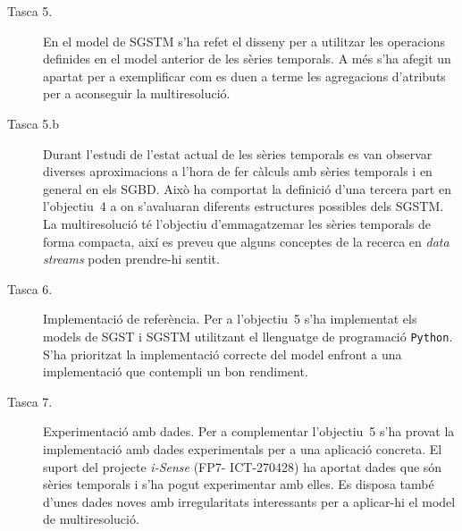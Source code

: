 \begin{description}
\item[Tasca 5.] En el model de SGSTM s'ha refet el disseny per a
  utilitzar les operacions definides en el model anterior de les
  sèries temporals. A més s'ha afegit un apartat per a exemplificar
  com es duen a terme les agregacions d'atributs per a aconseguir la
  multiresolució.



\item[Tasca 5.b] Durant l'estudi de l'estat actual de les sèries temporals
  es van observar diverses aproximacions a l'hora de fer càlculs amb
  sèries temporals i en general en els SGBD. Això ha comportat la
  definició d'una tercera part en l'objectiu~4 a on s'avaluaran
  diferents estructures possibles dels SGSTM.  La multiresolució té
  l'objectiu d'emmagatzemar les sèries temporals de forma compacta,
  així es preveu que alguns conceptes de la recerca en \emph{data
    streams} poden prendre-hi sentit.




\item[Tasca 6.] Implementació de referència. Per a l'objectiu~5 s'ha
  implementat els models de SGST i SGSTM utilitzant el llenguatge de
  programació \texttt{Python}. S'ha prioritzat la implementació
  correcte del model enfront a una implementació que contempli un bon
  rendiment. 



\item[Tasca 7.] Experimentació amb dades. Per a complementar
  l'objectiu~5 s'ha provat la implementació amb dades experimentals
  per a una aplicació concreta. El suport del projecte \emph{i-Sense}
  (FP7- ICT-270428) ha aportat dades que són sèries temporals i s'ha
  pogut experimentar amb elles. Es disposa també d'unes dades noves
  amb irregularitats interessants per a aplicar-hi el model de
  multiresolució.  






\end{description}

